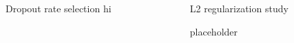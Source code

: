 \documentclass[final]{beamer}
\newlength{\onecolwid}
\newlength{\twocolwid}
\begin{document}
\begin{frame}[t]
\begin{columns}[t]
\begin{column}{\twocolwid}
%
%


\begin{columns}[t,totalwidth=\twocolwid] %

\begin{column}{\onecolwid} %


\begin{block}{Dropout rate selection}
hi
\end{block}


\end{column} %

\begin{column}{\onecolwid} %


\begin{block}{L2 regularization study}

placeholder

\end{block}


\end{column} %

\end{columns} %

\end{column} %


\end{columns}
\end{frame}
\end{document}
